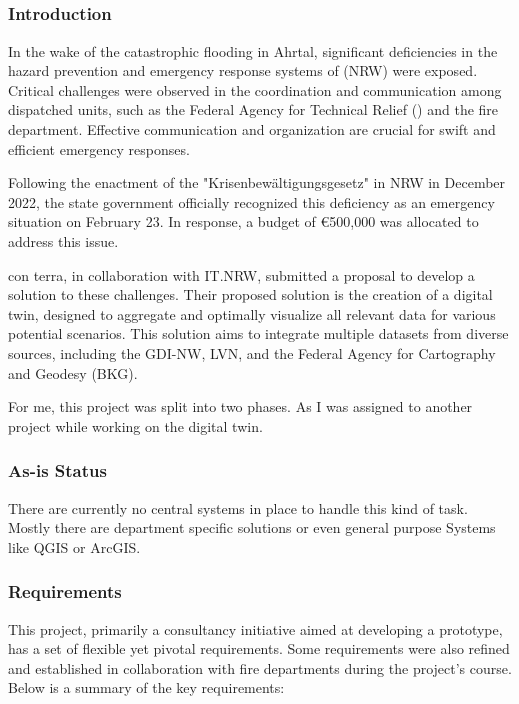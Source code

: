 \documentclass[11pt, titlepage, a4paper]{article}
\begin{document}
\subsection{}
\subsubsection{Introduction}
In the wake of the catastrophic flooding in Ahrtal, significant deficiencies in the hazard prevention and emergency response systems of (NRW) were exposed. Critical challenges were observed in the coordination and communication among dispatched units, such as the Federal Agency for Technical Relief () and the fire department. Effective communication and organization are crucial for swift and efficient emergency responses.

Following the enactment of the "Krisenbewältigungsgesetz" in NRW in December 2022, the state government officially recognized this deficiency as an emergency situation on February 23. In response, a budget of €500,000 was allocated to address this issue.

con terra, in collaboration with IT.NRW, submitted a proposal to develop a solution to these challenges. Their proposed solution is the creation of a digital twin, designed to aggregate and optimally visualize all relevant data for various potential scenarios. This solution aims to integrate multiple datasets from diverse sources, including the GDI-NW, LVN, and the Federal Agency for Cartography and Geodesy (BKG).

For me, this project was split into two phases. As I was assigned to another project while working on the digital twin.

\subsubsection{As-is Status}
There are currently no central systems in place to handle this kind of task. Mostly there are department specific solutions or even general purpose Systems like QGIS or ArcGIS.


\subsubsection{Requirements}
This project, primarily a consultancy initiative aimed at developing a prototype, has a set of flexible yet pivotal requirements. Some requirements were also refined and established in collaboration with fire departments during the project's course. Below is a summary of the key requirements:
\end{document}
